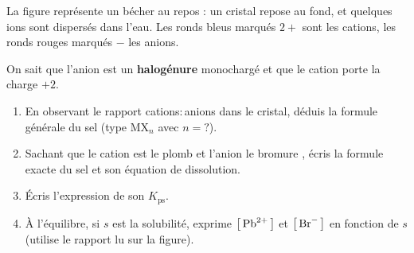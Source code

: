 \documentclass[11pt,a4paper]{article}
\newcommand{\Kps}{K_{\mathrm{ps}}}
\newcommand{\Ce}[1]{\left[\,\ce{#1}\,\right]}
\begin{document}
\begin{exercice}
La figure représente un bécher au repos : un cristal repose au fond, et quelques ions sont dispersés
dans l'eau. Les ronds bleus marqués $2{+}$ sont les cations, les ronds rouges marqués $-$ les anions.

\begin{center}
\end{center}

On sait que l'anion est un \textbf{halogénure} monochargé et que le cation porte la charge $+2$.
\begin{enumerate}[label=\textbf{\alph*)},leftmargin=2.2em,topsep=2pt,itemsep=2pt]
  \item En observant le rapport cations$:$anions dans le cristal, déduis la formule générale du sel
        (type $\mathrm{M}\mathrm{X}_n$ avec $n=?$).
  \item Sachant que le cation est le plomb  et l'anion le bromure , écris la formule
        exacte du sel et son équation de dissolution.
  \item Écris l'expression de son $\Kps$.
  \item À l'équilibre, si $s$ est la solubilité, exprime $\Ce{Pb^2+}$ et $\Ce{Br-}$ en fonction de $s$
        (utilise le rapport lu sur la figure).
\end{enumerate}
\end{exercice}
\end{document}
